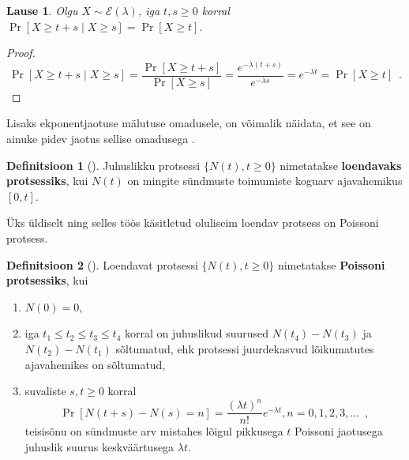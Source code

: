 \documentclass{article}
\newtheorem{lemma}{Lause}
\theoremstyle{definition}
\newtheorem{definition}{Definitsioon}
\newcommand{\prob}[1]{\Pr\left[#1\right]}
\begin{document}
\begin{lemma}
    Olgu $X \sim \mathcal{E}(\lambda)$, iga $t, s \geq 0$ korral $\prob{X \geq t + s \mid X \geq s} = \prob{X \geq t}$.
\end{lemma}

\begin{proof}
    \begin{equation*}
        \prob{X \geq t + s \mid X \geq s} = \frac{\prob{X \geq t + s}}{\prob{X \geq s}} = \frac{e^{- \lambda (t + s)}}{e^{- \lambda s}} = e^{- \lambda t} = \prob{X \geq t} \enspace .
    \end{equation*}
\end{proof}

Lisaks ekponentjaotuse mälutuse omadusele, on võimalik näidata, et see on ainuke pidev jaotus sellise omadusega \cite[lk 296]{introduction-to-probability-models}.


\begin{definition}[\cite{juhuslikud-protsessid}]
    Juhuslikku protsessi $\{ N(t) , t \geq 0 \}$ nimetatakse \textbf{loendavaks protsessiks}, kui $N(t)$ on mingite sündmuste toimumiste koguarv ajavahemikus $[0, t]$.
\end{definition}

Üks üldiselt ning selles töös käsitletud oluliseim loendav protsess on Poissoni protsess.

\begin{definition}[\cite{juhuslikud-protsessid}]
    Loendavat protsessi $\{ N(t) , t \geq 0 \}$ nimetatakse \textbf{Poissoni protsessiks}, kui
    \begin{enumerate}
        \item $N(0) = 0$, 
        \item iga $t_1 \leq t_2 \leq t_3 \leq t_4$ korral on juhuslikud suurused $N(t_4) - N(t_3)$ ja $N(t_2) - N(t_1)$ sõltumatud, ehk protsessi juurdekasvud lõikumatutes ajavahemikes on sõltumatud,
        \item suvaliste $s, t \geq 0$ korral
        \begin{equation*}
            \prob{N(t + s) - N(s) = n} = \frac{(\lambda t)^n}{n!} e^{- \lambda t} , n = 0, 1, 2, 3, \dots \enspace ,
        \end{equation*}
        teisisõnu on sündmuste arv mistahes lõigul pikkusega $t$ Poissoni jaotusega juhuslik suurus keskväärtusega $\lambda t$.
    \end{enumerate}
\end{definition}
\end{document}
